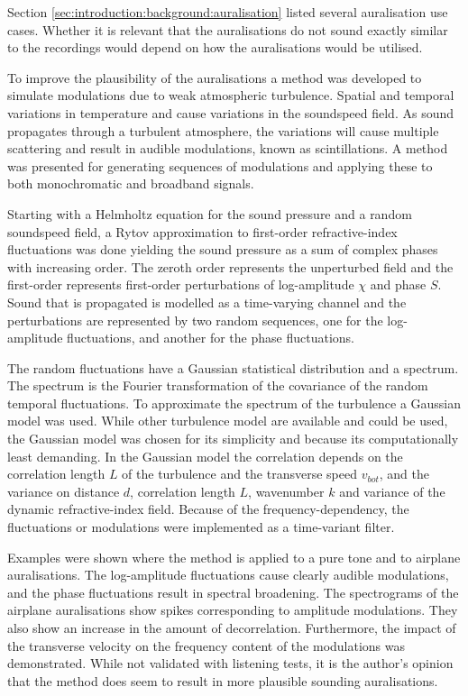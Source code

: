 Section \ref{sec:introduction:background:auralisation} listed several
auralisation use cases. Whether it is relevant that the auralisations do not
sound exactly similar to the recordings would depend on how the auralisations
would be utilised.

To improve the plausibility of the auralisations
a method was developed to simulate modulations due to weak atmospheric
turbulence. Spatial and temporal variations in temperature and cause variations
in the soundspeed field. As sound propagates through a turbulent atmosphere, the
variations will cause multiple scattering and result in audible modulations,
known as scintillations. A method was presented for generating sequences of
modulations and applying these to both monochromatic and broadband signals.

Starting with a Helmholtz equation for the sound pressure and a random
soundspeed field, a Rytov approximation to first-order refractive-index
fluctuations was done yielding the sound pressure as a sum of complex phases
with increasing order. The zeroth order represents the unperturbed field and the
first-order represents first-order perturbations of log-amplitude $\chi$ and
phase $S$. Sound that is propagated is modelled as a time-varying channel and
the perturbations are represented by two random sequences, one for the
log-amplitude fluctuations, and another for the phase fluctuations.

The random fluctuations have a Gaussian statistical distribution and a spectrum.
The spectrum is the Fourier transformation of the covariance of the random
temporal fluctuations. To approximate the spectrum of the turbulence a Gaussian
model was used. While other turbulence model are available and could be used,
the Gaussian model was chosen for its simplicity and because its computationally
least demanding. In the Gaussian model the correlation depends on the
correlation length $L$ of the turbulence and the transverse speed $v_{bot}$, and
the variance on distance $d$, correlation length $L$, wavenumber $k$ and
variance of the dynamic refractive-index field. Because of the
frequency-dependency, the fluctuations or modulations were implemented as a
time-variant filter.

Examples were shown where the method is applied to a pure tone and to airplane
auralisations. The log-amplitude fluctuations cause clearly audible modulations,
and the phase fluctuations result in spectral broadening. The spectrograms of
the airplane auralisations show spikes corresponding to amplitude modulations.
They also show an increase in the amount of decorrelation. Furthermore, the
impact of the transverse velocity on the frequency content of the modulations
was demonstrated. While not validated with listening tests, it is the author's
opinion that the method does seem to result in more plausible sounding
auralisations.

